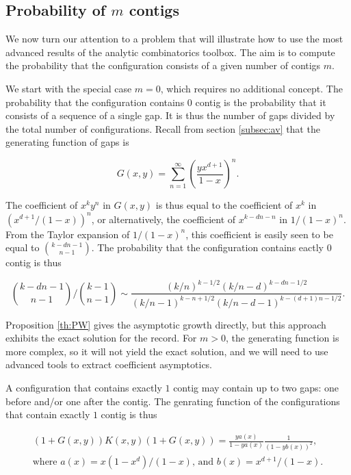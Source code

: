 \documentclass{article}
\begin{document}
\subsection{Probability of $m$ contigs}
\label{subsec:probmcontigs}

We now turn our attention to a problem that will illustrate how to use the
most advanced results of the analytic combinatorics toolbox. The aim
is to compute the probability that the configuration consists of a
given number of contigs $m$.

We start with the special case $m = 0$, which requires no additional
concept. The probability that the configuration contains $0$ contig is the
probability that it consists of a sequence of a single gap. It is thus the
number of gaps divided by the total number of configurations. Recall from
section \ref{subsec:av} that the generating function of gaps is

\begin{equation*}
G(x,y) = \sum_{n=1}^\infty \left( \frac{yx^{d+1}}{1-x} \right )^n.
\end{equation*}

The coefficient of $x^ky^n$ in $G(x,y)$ is thus equal to the coefficient
of $x^k$ in $\left(x^{d+1}/(1-x)\right)^n$, or alternatively, the
coefficient of $x^{k-dn-n}$ in $1/(1-x)^n$. From the Taylor expansion of
$1/(1-x)^n$, this coefficient is easily seen to be equal to ${k-dn-1
\choose n-1}$. The probability that the configuration contains eactly $0$
contig is thus

\begin{equation}
\label{eq:m=0}
{k-dn-1 \choose n-1} \Big/ {k-1 \choose n-1} \sim 
\frac{(k/n)^{k-1/2}(k/n-d)^{k-dn-1/2}}
 {(k/n-1)^{k-n+1/2}(k/n-d-1)^{k-(d+1)n-1/2}}.
\end{equation}

Proposition \ref{th:PW} gives the asymptotic growth directly, but this
approach exhibits the exact solution for the record. For $m > 0$, the
generating function is more complex, so it will not yield the exact
solution, and we will need to use advanced tools to extract coefficient
asymptotics.

A configuration that contains exactly $1$ contig may contain up to two
gaps: one before and/or one after the contig. The genrating function of
the configurations that contain exactly $1$ contig is thus

\begin{equation*}
\begin{split}
(1+G(x,y))K(x,y)(1+G(x,y)) =
\frac{ya(x)}{1-ya(x)}
\frac{1}{\left(1-yb(x)\right)^2}, \\
\text{where $a(x) = x(1-x^d)/(1-x)$, and $b(x) = x^{d+1}/(1-x)$}.
\end{split}
\end{equation*}
\end{document}
